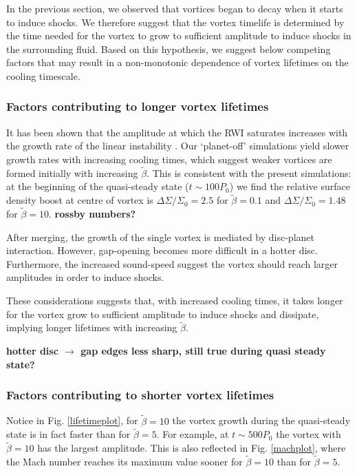 In the previous section, we observed that vortices began to decay when
it starts to induce shocks. We therefore suggest that the vortex
timelife is determined by the time needed for the vortex to grow to
sufficient amplitude to induce shocks in the surrounding
fluid. Based on this hypothesis, we suggest below competing
factors that may result in a non-monotonic dependence of vortex
lifetimes on the cooling timescale.  

\subsubsection{Factors contributing to longer vortex lifetimes}
It has been shown that the amplitude at which the RWI saturates 
increases with the growth rate of the linear instability  
\citep{meheut2013}. Our `planet-off' simulations yield slower growth
rates with increasing cooling times, which suggest weaker vortices are
formed initially with increasing $\tilde{\beta}$. This is consistent
with the present simulations: at the beginning of the 
quasi-steady state ($t\sim100P_0$) we find the relative surface density
boost at centre of vortex is $\Delta\Sigma/\Sigma_0=2.5$ for
$\tilde\beta=0.1$ and $\Delta\Sigma/\Sigma_0=1.48$ for
$\tilde\beta=10$.  {\bf rossby numbers?} 

After merging, the growth of the single vortex is mediated by disc-planet
interaction. However, gap-opening becomes more difficult in a hotter 
disc. Furthermore, the increased sound-speed suggest the vortex should    
reach larger amplitudes in order to induce shocks. 

These considerations suggests that, with increased cooling times, 
it takes longer for the vortex grow to sufficient amplitude to induce
shocks and dissipate, implying longer lifetimes with increasing 
$\tilde{\beta}$.      

{\bf hotter disc $\to$ gap edges less sharp, still true during quasi
  steady state?}

\subsubsection{Factors contributing to shorter vortex lifetimes} 
Notice in Fig. \ref{lifetimeplot}, for $\tilde{\beta}=10$ the vortex 
growth during the quasi-steady state is in fact faster than for
$\tilde{\beta}=5$. For example, at $t\sim 500P_0$ the vortex with   
$\tilde{\beta}=10$ has the largest amplitude. This is also reflected
in Fig. \ref{machplot}, where the Mach number reaches its maximum
value sooner for $\tilde{\beta}=10$ than for $\tilde{\beta}=5$. 

